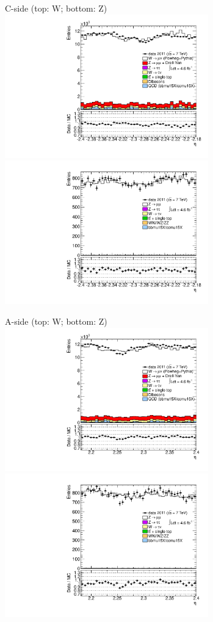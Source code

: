 {

\colb[T]

C-side (top: W; bottom: Z)
\centering
\includegraphics[width=0.66\textwidth]{dates/20130306/figures/etaphi/W_11_C_stack_l_eta_POS} \\
\includegraphics[width=0.66\textwidth]{dates/20130306/figures/etaphi/Z_11_C_stack_lP_eta_ALL.pdf}

A-side (top: W; bottom: Z)
\centering
\includegraphics[width=0.66\textwidth]{dates/20130306/figures/etaphi/W_11_A_stack_l_eta_POS} \\
\includegraphics[width=0.66\textwidth]{dates/20130306/figures/etaphi/Z_11_A_stack_lP_eta_ALL.pdf} 

\cole
}


